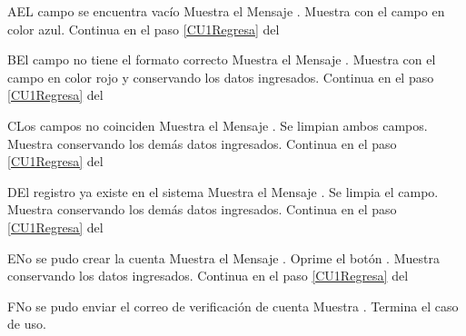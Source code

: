 \begin{UCtrayectoriaA}{A}{EL campo se encuentra vacío}
	\UCpaso Muestra el Mensaje \textbf{}.
    \UCpaso Muestra  con el campo en color azul.
	\UCpaso Continua en el paso \ref{CU1Regresa} del 
\end{UCtrayectoriaA}
		
\begin{UCtrayectoriaA}{B}{El campo no tiene el formato correcto}
    \UCpaso Muestra el Mensaje \textbf{}.
    \UCpaso Muestra  con el campo en color rojo y conservando los datos ingresados.
	\UCpaso Continua en el paso \ref{CU1Regresa} del 
\end{UCtrayectoriaA}

\begin{UCtrayectoriaA}{C}{Los campos no coinciden}
    \UCpaso Muestra el Mensaje \textbf{}.
    \UCpaso Se limpian ambos campos.
    \UCpaso Muestra  conservando los demás datos ingresados.
	\UCpaso Continua en el paso \ref{CU1Regresa} del 
\end{UCtrayectoriaA}

\begin{UCtrayectoriaA}{D}{El registro ya existe en el sistema}
    \UCpaso Muestra el Mensaje \textbf{}.
    \UCpaso Se limpia el campo.
    \UCpaso Muestra  conservando los demás datos ingresados.
	\UCpaso Continua en el paso \ref{CU1Regresa} del 
\end{UCtrayectoriaA}

\begin{UCtrayectoriaA}{E}{No se pudo crear la cuenta}
    \UCpaso Muestra el Mensaje \textbf{}.
    \UCpaso[\UCactor] Oprime el botón .
    \UCpaso Muestra  conservando los datos ingresados.
    \UCpaso Continua en el paso \ref{CU1Regresa} del 
\end{UCtrayectoriaA}

\begin{UCtrayectoriaA}{F}{No se pudo enviar el correo de verificación de cuenta}
    \UCpaso Muestra .
	\UCpaso Termina el caso de uso.
\end{UCtrayectoriaA}

